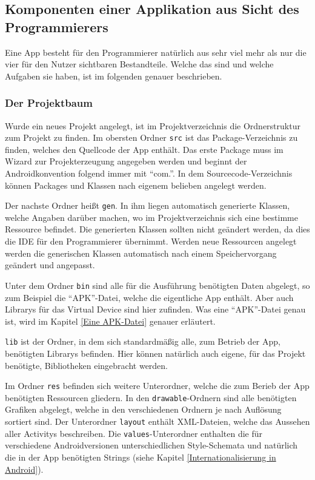 \subsection{Komponenten einer Applikation aus Sicht des Programmierers} \label{Componenten einer Applikation aus Sicht des Programmierers}
Eine App besteht f\"ur den Programmierer nat\"urlich aus sehr viel mehr als nur die vier f\"ur den Nutzer sichtbaren Bestandteile. Welche das sind und welche Aufgaben sie haben, ist im folgenden genauer beschrieben. \cite{GolemHBAppAusEntwicklerSicht}

\subsubsection{Der Projektbaum}
Wurde ein neues Projekt angelegt, ist im Projektverzeichnis die Ordnerstruktur zum Projekt zu finden. Im obersten Ordner \texttt{src} ist das Package-Verzeichnis zu finden, welches den Quellcode der App enth\"alt. Das erste Package muss im Wizard zur Projekterzeugung angegeben werden und beginnt der Androidkonvention folgend immer mit "`com."'. In dem Sourcecode-Verzeichnis k\"onnen Packages und Klassen nach eigenem belieben angelegt werden.

Der nachste Ordner hei\ss{}t \texttt{gen}. In ihm liegen automatisch generierte Klassen, welche Angaben dar\"uber machen, wo im Projektverzeichnis sich eine bestimme Ressource befindet.
Die generierten Klassen sollten nicht ge\"andert werden, da dies die \ac{IDE} f\"ur den Programmierer \"ubernimmt. Werden neue Ressourcen angelegt werden die generischen Klassen automatisch nach einem Speichervorgang ge\"andert und angepasst.

Unter dem Ordner \texttt{bin} sind alle f\"ur die Ausf\"uhrung ben\"otigten Daten abgelegt, so zum Beispiel die "`APK"'-Datei, welche die eigentliche App enth\"alt. Aber auch Librarys f\"ur das Virtual Device sind hier zufinden. Was eine "`APK"'-Datei genau ist, wird im Kapitel \ref{Eine APK-Datei} genauer erl\"autert.

\texttt{lib} ist der Ordner, in dem sich standardm\"a\ss{}ig alle, zum Betrieb der App, ben\"otigten Librarys befinden. Hier k\"onnen nat\"urlich auch eigene, f\"ur das Projekt ben\"otigte, Bibliotheken eingebracht werden.

Im Ordner \texttt{res} befinden sich weitere Unterordner, welche die zum Berieb der App ben\"otigten Ressourcen gliedern. In den \texttt{drawable}-Ordnern sind alle ben\"otigten Grafiken abgelegt, welche in den verschiedenen Ordnern je nach Aufl\"osung sortiert sind. Der Unterordner \texttt{layout} enth\"alt XML-Dateien, welche das Aussehen aller Activitys beschreiben. Die \texttt{values}-Unterordner enthalten die f\"ur verschiedene Androidversionen unterschiedlichen Style-Schemata und nat\"urlich die in der App ben\"otigten Strings (siehe Kapitel \ref{Internationalisierung in Android}).

